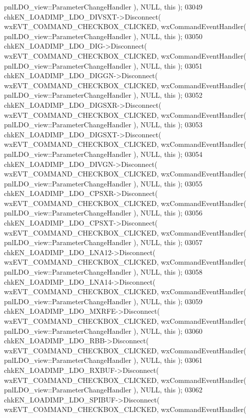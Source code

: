 \begin{DoxyCode}
      pnlLDO_view::ParameterChangeHandler ), NULL, \textcolor{keyword}{this} );
03049     chkEN_LOADIMP_LDO_DIVSXT->Disconnect( wxEVT\_COMMAND\_CHECKBOX\_CLICKED, wxCommandEventHandler( 
      pnlLDO_view::ParameterChangeHandler ), NULL, \textcolor{keyword}{this} );
03050     chkEN_LOADIMP_LDO_DIG->Disconnect( wxEVT\_COMMAND\_CHECKBOX\_CLICKED, wxCommandEventHandler( 
      pnlLDO_view::ParameterChangeHandler ), NULL, \textcolor{keyword}{this} );
03051     chkEN_LOADIMP_LDO_DIGGN->Disconnect( wxEVT\_COMMAND\_CHECKBOX\_CLICKED, wxCommandEventHandler( 
      pnlLDO_view::ParameterChangeHandler ), NULL, \textcolor{keyword}{this} );
03052     chkEN_LOADIMP_LDO_DIGSXR->Disconnect( wxEVT\_COMMAND\_CHECKBOX\_CLICKED, wxCommandEventHandler( 
      pnlLDO_view::ParameterChangeHandler ), NULL, \textcolor{keyword}{this} );
03053     chkEN_LOADIMP_LDO_DIGSXT->Disconnect( wxEVT\_COMMAND\_CHECKBOX\_CLICKED, wxCommandEventHandler( 
      pnlLDO_view::ParameterChangeHandler ), NULL, \textcolor{keyword}{this} );
03054     chkEN_LOADIMP_LDO_DIVGN->Disconnect( wxEVT\_COMMAND\_CHECKBOX\_CLICKED, wxCommandEventHandler( 
      pnlLDO_view::ParameterChangeHandler ), NULL, \textcolor{keyword}{this} );
03055     chkEN_LOADIMP_LDO_CPSXR->Disconnect( wxEVT\_COMMAND\_CHECKBOX\_CLICKED, wxCommandEventHandler( 
      pnlLDO_view::ParameterChangeHandler ), NULL, \textcolor{keyword}{this} );
03056     chkEN_LOADIMP_LDO_CPSXT->Disconnect( wxEVT\_COMMAND\_CHECKBOX\_CLICKED, wxCommandEventHandler( 
      pnlLDO_view::ParameterChangeHandler ), NULL, \textcolor{keyword}{this} );
03057     chkEN_LOADIMP_LDO_LNA12->Disconnect( wxEVT\_COMMAND\_CHECKBOX\_CLICKED, wxCommandEventHandler( 
      pnlLDO_view::ParameterChangeHandler ), NULL, \textcolor{keyword}{this} );
03058     chkEN_LOADIMP_LDO_LNA14->Disconnect( wxEVT\_COMMAND\_CHECKBOX\_CLICKED, wxCommandEventHandler( 
      pnlLDO_view::ParameterChangeHandler ), NULL, \textcolor{keyword}{this} );
03059     chkEN_LOADIMP_LDO_MXRFE->Disconnect( wxEVT\_COMMAND\_CHECKBOX\_CLICKED, wxCommandEventHandler( 
      pnlLDO_view::ParameterChangeHandler ), NULL, \textcolor{keyword}{this} );
03060     chkEN_LOADIMP_LDO_RBB->Disconnect( wxEVT\_COMMAND\_CHECKBOX\_CLICKED, wxCommandEventHandler( 
      pnlLDO_view::ParameterChangeHandler ), NULL, \textcolor{keyword}{this} );
03061     chkEN_LOADIMP_LDO_RXBUF->Disconnect( wxEVT\_COMMAND\_CHECKBOX\_CLICKED, wxCommandEventHandler( 
      pnlLDO_view::ParameterChangeHandler ), NULL, \textcolor{keyword}{this} );
03062     chkEN_LOADIMP_LDO_SPIBUF->Disconnect( wxEVT\_COMMAND\_CHECKBOX\_CLICKED, wxCommandEventHandler( 

\end{DoxyCode}
